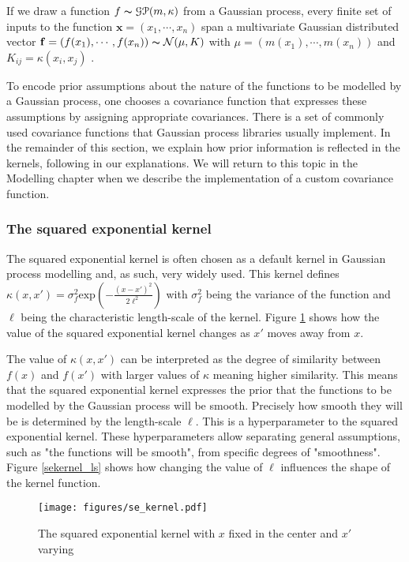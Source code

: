 \documentclass[a4paper,12pt,twoside,openright]{report}
\begin{document}
If we draw a function $f \thicksim \EuScript{G}\EuScript{P}(m, \kappa)$ from a Gaussian process, every finite set of inputs to the function $\mathbf{x} = (x_1, \cdots, x_n)$ span a multivariate Gaussian distributed vector $\mathbf{f} = (f(x_1), \cdots, f(x_n)) \thicksim \mathcal{N}(\mu,K)$ with $\mu = (m(x_1), \cdots, m(x_n))$ and $K_{ij} = \kappa(x_i, x_j)$ \cite{Rasmussen:2005:GPM:1162254}.

To encode prior assumptions about the nature of the functions to be modelled by a Gaussian process, one chooses a covariance function that expresses these assumptions by assigning appropriate covariances. There is a set of commonly used covariance functions that Gaussian process libraries usually implement. In the remainder of this section, we explain how prior information is reflected in the kernels, following \cite{duvenaudthesis} in our explanations. We will return to this topic in the Modelling chapter when we describe the implementation of a custom covariance function. 

\subsubsection{The squared exponential kernel}
The squared exponential kernel is often chosen as a default kernel in Gaussian process modelling and, as such, very widely used. This kernel defines $\kappa(x, x') = \sigma_f^2 \text{exp}(-\frac{(x-x')^2}{2\ell^2})$ with $\sigma_f^2$ being the variance of the function and $\ell$ being the characteristic length-scale of the kernel. Figure \ref{sekernel} shows how the value of the squared exponential kernel changes as $x'$ moves away from $x$. 

The value of $\kappa(x, x')$ can be interpreted as the degree of similarity between $f(x)$ and $f(x')$ with larger values of $\kappa$ meaning higher similarity. This means that the squared exponential kernel expresses the prior that the functions to be modelled by the Gaussian process will be smooth. Precisely how smooth they will be is determined by the length-scale $\ell$. This is a hyperparameter to the squared exponential kernel. These hyperparameters allow separating general assumptions, such as "the functions will be smooth", from specific degrees of "smoothness". Figure \ref{sekernel_ls} shows how changing the value of $\ell$ influences the shape of the kernel function.

\begin{figure}
\centering
  \texttt{[image: figures/se\_kernel.pdf]}
  \caption{The squared exponential kernel with $x$ fixed in the center and $x'$ varying}
  \label{sekernel}
\end{figure}
\end{document}
